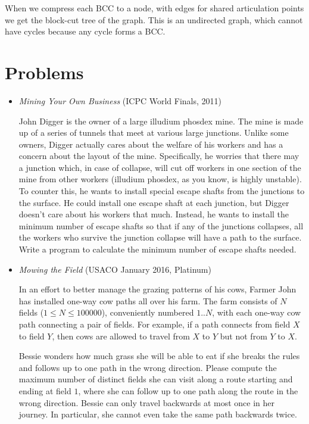 \documentclass{article}
\begin{document}
When we compress each BCC to a node, with edges for shared articulation points we get the block-cut tree of the graph.  This is an undirected graph, which cannot have cycles because any cycle forms a BCC.

\section{Problems}

\begin{itemize}[leftmargin=0pt]
\item[\label={}]
\textit{Mining Your Own Business} (ICPC World Finals, 2011)

John Digger is the owner of a large illudium phosdex mine. The mine is made up of a series of tunnels
that meet at various large junctions. Unlike some owners, Digger actually cares about the welfare of
his workers and has a concern about the layout of the mine. Specifically, he worries that there may a
junction which, in case of collapse, will cut off workers in one section of the mine from other workers
(illudium phosdex, as you know, is highly unstable). To counter this, he wants to install special escape
shafts from the junctions to the surface. He could install one escape shaft at each junction, but Digger
doesn’t care about his workers that much. Instead, he wants to install the minimum number of escape
shafts so that if any of the junctions collapses, all the workers who survive the junction collapse will
have a path to the surface.
Write a program to calculate the minimum number of escape shafts needed.

\item[\label={}]
\textit{Mowing the Field} (USACO January 2016, Platinum)

In an effort to better manage the grazing patterns of his cows, Farmer
John has installed one-way cow paths all over his farm.  The farm
consists of $N$ fields ($1 \le N \le 100000$), conveniently numbered $1..N$, with each one-way
cow path connecting a pair of fields. For example, if a path connects
from field $X$ to field $Y$, then cows are allowed to travel from $X$ to $Y$
but not from $Y$ to $X$.

Bessie wonders how much grass she will be able to eat if she
breaks the rules and follows up to one path in the wrong direction.
Please compute the maximum number of distinct fields she can visit
along a route starting and ending at field $1$, where she can follow up
to one path along the route in the wrong direction.  Bessie can only
travel backwards at most once in her journey.  In particular, she
cannot even take the same path backwards twice.


\end{itemize}
\end{document}
